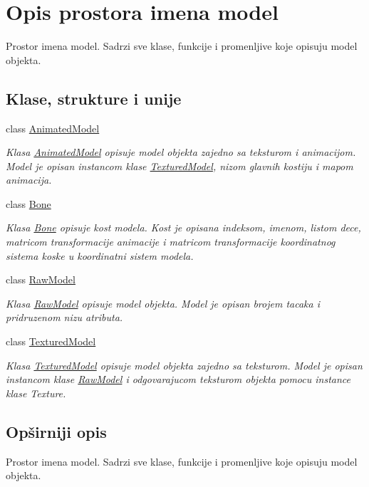 \hypertarget{namespacemodel}{}\section{Opis prostora imena model}
\label{namespacemodel}


Prostor imena model. Sadrzi sve klase, funkcije i promenljive koje opisuju model objekta.  


\subsection*{Klase, strukture i unije}
\begin{DoxyCompactItemize}
\item 
class \hyperlink{classmodel_1_1AnimatedModel}{Animated\+Model}
\begin{DoxyCompactList}\small\item\em Klasa \hyperlink{classmodel_1_1AnimatedModel}{Animated\+Model} opisuje model objekta zajedno sa teksturom i animacijom. Model je opisan instancom klase \hyperlink{classmodel_1_1TexturedModel}{Textured\+Model}, nizom glavnih kostiju i mapom animacija. \end{DoxyCompactList}\item 
class \hyperlink{classmodel_1_1Bone}{Bone}
\begin{DoxyCompactList}\small\item\em Klasa \hyperlink{classmodel_1_1Bone}{Bone} opisuje kost modela. Kost je opisana indeksom, imenom, listom dece, matricom transformacije animacije i matricom transformacije koordinatnog sistema koske u koordinatni sistem modela. \end{DoxyCompactList}\item 
class \hyperlink{classmodel_1_1RawModel}{Raw\+Model}
\begin{DoxyCompactList}\small\item\em Klasa \hyperlink{classmodel_1_1RawModel}{Raw\+Model} opisuje model objekta. Model je opisan brojem tacaka i pridruzenom nizu atributa. \end{DoxyCompactList}\item 
class \hyperlink{classmodel_1_1TexturedModel}{Textured\+Model}
\begin{DoxyCompactList}\small\item\em Klasa \hyperlink{classmodel_1_1TexturedModel}{Textured\+Model} opisuje model objekta zajedno sa teksturom. Model je opisan instancom klase \hyperlink{classmodel_1_1RawModel}{Raw\+Model} i odgovarajucom teksturom objekta pomocu instance klase Texture. \end{DoxyCompactList}\end{DoxyCompactItemize}


\subsection{Opširniji opis}
Prostor imena model. Sadrzi sve klase, funkcije i promenljive koje opisuju model objekta. 